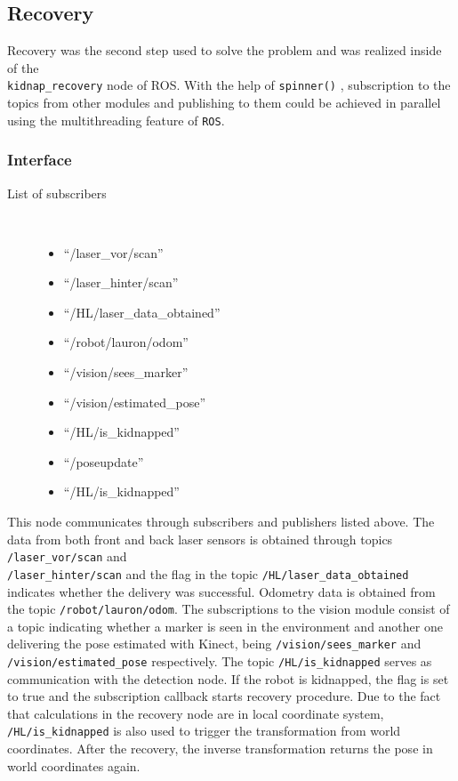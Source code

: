 \subsection{Recovery}
Recovery was the second step used to solve the problem and was realized inside of the
\\
\texttt{kidnap\_recovery} node of ROS. With the help of \texttt{spinner()} , subscription to the topics from other modules and publishing to them could be achieved in parallel using the multithreading feature of \texttt{ROS}. 

\subsubsection{Interface}
\begin{description}
\item[List of subscribers]\
	\begin{itemize}
	\item ``/laser\_vor/scan'' 
	\item ``/laser\_hinter/scan'' 
	\item ``/HL/laser\_data\_obtained''
	\item ``/robot/lauron/odom''
	\item ``/vision/sees\_marker'' 
	\item ``/vision/estimated\_pose'' 
	\item ``/HL/is\_kidnapped'' 
	\item ``/poseupdate'' 
	\item ``/HL/is\_kidnapped'' 
	\end{itemize}
\end{description}	
	
This node communicates through subscribers and publishers listed above. The data from both front and back laser sensors is obtained through topics \texttt{/laser\_vor/scan} and
\\
\texttt{/laser\_hinter/scan} and the flag in the topic \texttt{/HL/laser\_data\_obtained} indicates whether the delivery was successful. Odometry data is obtained from the topic \texttt{/robot/lauron/odom}. The subscriptions to the vision module consist of a topic indicating whether a marker is seen in the environment and another one delivering the pose estimated with Kinect, being \texttt{/vision/sees\_marker} and \texttt{/vision/estimated\_pose} respectively. The topic \texttt{/HL/is\_kidnapped} serves as communication with the detection node. If the robot is kidnapped, the flag is set to true and the subscription callback starts recovery procedure. Due to the fact that calculations in the recovery node are in local coordinate system, \texttt{/HL/is\_kidnapped} is also used to trigger the transformation from world coordinates. After the recovery, the inverse transformation returns the pose in world coordinates again.

